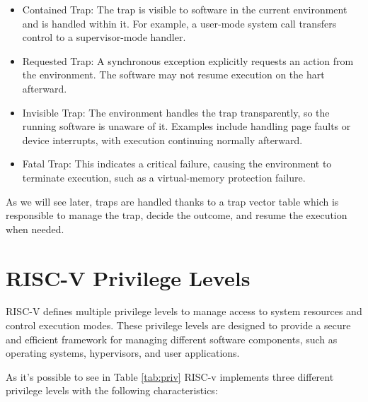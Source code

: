 \begin{itemize}
  \item Contained Trap: The trap is visible to software in the current
    environment and is handled within it. For example, a user-mode system call
    transfers control to a supervisor-mode handler.

  \item Requested Trap: A synchronous exception explicitly requests an action
    from the environment. The software may not resume execution on the hart afterward.

  \item Invisible Trap: The environment handles the trap transparently, so the running
    software is unaware of it. Examples include handling page faults or device
    interrupts, with execution continuing normally afterward.

  \item Fatal Trap: This indicates a critical failure, causing the environment to
    terminate execution, such as a virtual-memory protection failure.
\end{itemize}

As we will see later, traps are handled thanks to a trap vector table which is responsible
to manage the trap, decide the outcome, and resume the execution when needed.

\section{RISC-V Privilege Levels}
\label{sec:riscv_privileges}

RISC-V defines multiple privilege levels to manage access to system resources
and control execution modes. These privilege levels are designed to provide a secure
and efficient framework for managing different software components, such as
operating systems, hypervisors, and user applications.

As it's possible to see in Table \ref{tab:priv} RISC-v implements three
different privilege levels with the following characteristics:

